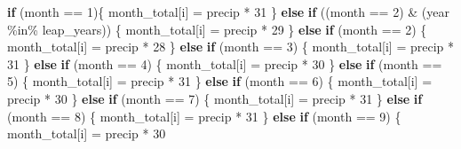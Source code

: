 \documentclass[
]{article}
\newenvironment{Shaded}{\begin{snugshade}}{\end{snugshade}}
\newcommand{\ControlFlowTok}[1]{\textcolor[rgb]{0.13,0.29,0.53}{\textbf{#1}}}
\newcommand{\DecValTok}[1]{\textcolor[rgb]{0.00,0.00,0.81}{#1}}
\newcommand{\NormalTok}[1]{#1}
\newcommand{\OtherTok}[1]{\textcolor[rgb]{0.56,0.35,0.01}{#1}}
\newcommand{\SpecialCharTok}[1]{\textcolor[rgb]{0.00,0.00,0.00}{#1}}
\newcommand{\StringTok}[1]{\textcolor[rgb]{0.31,0.60,0.02}{#1}}
\begin{document}
\begin{Shaded}
\begin{Highlighting}[]
  \ControlFlowTok{if}\NormalTok{ (month }\SpecialCharTok{==} \StringTok{\textquotesingle{}1\textquotesingle{}}\NormalTok{)\{}
\NormalTok{    month\_total[i] }\OtherTok{=}\NormalTok{ precip }\SpecialCharTok{*} \DecValTok{31}
\NormalTok{  \} }\ControlFlowTok{else} \ControlFlowTok{if}\NormalTok{ ((month }\SpecialCharTok{==} \StringTok{\textquotesingle{}2\textquotesingle{}}\NormalTok{) }\SpecialCharTok{\&}\NormalTok{ (year }\SpecialCharTok{\%in\%}\NormalTok{ leap\_years)) \{}
\NormalTok{    month\_total[i] }\OtherTok{=}\NormalTok{ precip }\SpecialCharTok{*} \DecValTok{29}
\NormalTok{  \} }\ControlFlowTok{else} \ControlFlowTok{if}\NormalTok{ (month }\SpecialCharTok{==} \StringTok{\textquotesingle{}2\textquotesingle{}}\NormalTok{) \{}
\NormalTok{    month\_total[i] }\OtherTok{=}\NormalTok{ precip }\SpecialCharTok{*} \DecValTok{28}
\NormalTok{  \} }\ControlFlowTok{else} \ControlFlowTok{if}\NormalTok{ (month }\SpecialCharTok{==} \StringTok{\textquotesingle{}3\textquotesingle{}}\NormalTok{) \{}
\NormalTok{    month\_total[i] }\OtherTok{=}\NormalTok{ precip }\SpecialCharTok{*} \DecValTok{31}
\NormalTok{  \} }\ControlFlowTok{else} \ControlFlowTok{if}\NormalTok{ (month }\SpecialCharTok{==} \StringTok{\textquotesingle{}4\textquotesingle{}}\NormalTok{) \{}
\NormalTok{    month\_total[i] }\OtherTok{=}\NormalTok{ precip }\SpecialCharTok{*} \DecValTok{30}
\NormalTok{  \} }\ControlFlowTok{else} \ControlFlowTok{if}\NormalTok{ (month }\SpecialCharTok{==} \StringTok{\textquotesingle{}5\textquotesingle{}}\NormalTok{) \{}
\NormalTok{    month\_total[i] }\OtherTok{=}\NormalTok{ precip }\SpecialCharTok{*} \DecValTok{31}
\NormalTok{  \} }\ControlFlowTok{else} \ControlFlowTok{if}\NormalTok{ (month }\SpecialCharTok{==} \StringTok{\textquotesingle{}6\textquotesingle{}}\NormalTok{) \{}
\NormalTok{    month\_total[i] }\OtherTok{=}\NormalTok{ precip }\SpecialCharTok{*} \DecValTok{30}
\NormalTok{  \} }\ControlFlowTok{else} \ControlFlowTok{if}\NormalTok{ (month }\SpecialCharTok{==} \StringTok{\textquotesingle{}7\textquotesingle{}}\NormalTok{) \{}
\NormalTok{    month\_total[i] }\OtherTok{=}\NormalTok{ precip }\SpecialCharTok{*} \DecValTok{31}
\NormalTok{  \} }\ControlFlowTok{else} \ControlFlowTok{if}\NormalTok{ (month }\SpecialCharTok{==} \StringTok{\textquotesingle{}8\textquotesingle{}}\NormalTok{) \{}
\NormalTok{    month\_total[i] }\OtherTok{=}\NormalTok{ precip }\SpecialCharTok{*} \DecValTok{31}
\NormalTok{  \} }\ControlFlowTok{else} \ControlFlowTok{if}\NormalTok{ (month }\SpecialCharTok{==} \StringTok{\textquotesingle{}9\textquotesingle{}}\NormalTok{) \{}
\NormalTok{    month\_total[i] }\OtherTok{=}\NormalTok{ precip }\SpecialCharTok{*} \DecValTok{30}

\end{Highlighting}
\end{Shaded}
\end{document}
